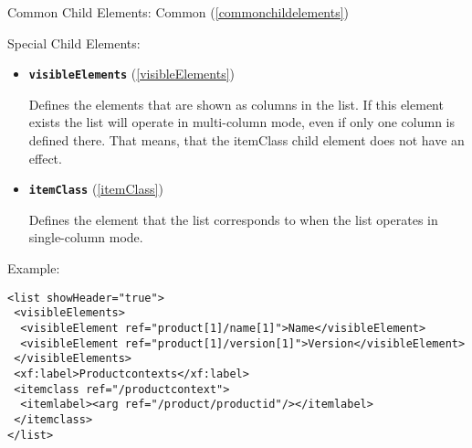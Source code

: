 \begin{description}
 \item Common Child Elements: Common (\ref{commonchildelements})

 \item Special Child Elements:

\begin{itemize}
 \item \textbf{\texttt{visibleElements}} (\ref{visibleElements})

Defines the elements that are shown as columns in the list. If this element exists the list will operate in multi-column mode, even if only one column is defined there. That means, that the itemClass child element does not have an effect.

 \item \textbf{\texttt{itemClass}} (\ref{itemClass})

Defines the element that the list corresponds to when the list operates in single-column mode.
\end{itemize}

 \item Example: 

\begin{lstlisting}[caption=\texttt{list} Element]
<list showHeader="true">
 <visibleElements>
  <visibleElement ref="product[1]/name[1]">Name</visibleElement>
  <visibleElement ref="product[1]/version[1]">Version</visibleElement>
 </visibleElements>
 <xf:label>Productcontexts</xf:label>
 <itemclass ref="/productcontext">
  <itemlabel><arg ref="/product/productid"/></itemlabel>
 </itemclass>
</list>
\end{lstlisting}
\end{description}









